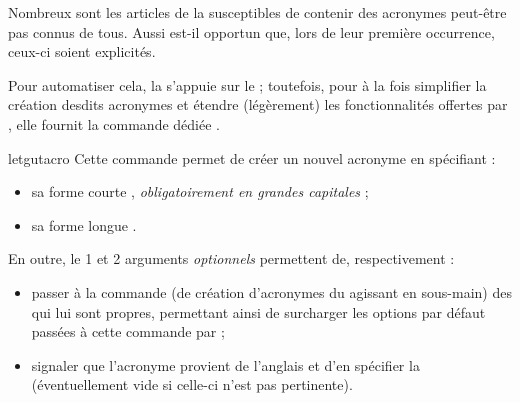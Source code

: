 \documentclass{letgut}
\begin{document}
Nombreux sont les articles de la  susceptibles de contenir des
acronymes peut-être pas connus de tous. Aussi est-il opportun que, lors de leur
première occurrence, ceux-ci soient explicités.

Pour automatiser cela, la  s'appuie sur le  ;
toutefois, pour à la fois simplifier la création desdits acronymes et étendre
(légèrement) les fonctionnalités offertes par , elle fournit la
commande dédiée .

\begin{docCommand}{letgutacro}{}
  Cette commande permet de créer un nouvel acronyme en spécifiant :
  \begin{itemize}
  \item sa forme courte , \emph{obligatoirement en grandes
      capitales} ;
  \item sa forme longue .
  \end{itemize}
  En outre, le 1\ier{} et 2\ieme{} arguments \emph{optionnels} permettent de,
  respectivement :
  \begin{itemize}
  \item passer à la commande  (de création
    d'acronymes du  agissant en sous-main) des  qui
    lui sont propres, permettant ainsi de surcharger les options par défaut
    passées à cette commande par  ;
  \item signaler que l'acronyme provient de l'anglais et d'en spécifier la
     (éventuellement vide si celle-ci n'est pas
    pertinente).
  \end{itemize}


\end{docCommand}
\end{document}
